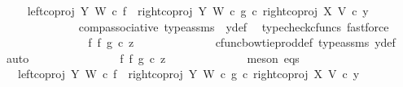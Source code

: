 \begin{isabellebody}
\ \isamarkupfalse%
\ {\isachardoublequoteopen}{\isachardot}{\kern0pt}{\isachardot}{\kern0pt}{\isachardot}{\kern0pt}\ {\isacharequal}{\kern0pt}\ {\isacharparenleft}{\kern0pt}{\isacharparenleft}{\kern0pt}left{\isacharunderscore}{\kern0pt}coproj\ Y\ W\ {\isasymcirc}\isactrlsub c\ f{\isacharparenright}{\kern0pt}\ {\isasymamalg}\ {\isacharparenleft}{\kern0pt}right{\isacharunderscore}{\kern0pt}coproj\ Y\ W\ {\isasymcirc}\isactrlsub c\ g{\isacharparenright}{\kern0pt}{\isacharparenright}{\kern0pt}\ {\isasymcirc}\isactrlsub c\ right{\isacharunderscore}{\kern0pt}coproj\ X\ V\ {\isasymcirc}\isactrlsub c\ y{}{\isachardoublequoteclose}\isanewline
\ \ \ \ \ \ \ \ \ \ \ \ \isamarkupfalse%
\ comp{\isacharunderscore}{\kern0pt}associative{}\ type{\isacharunderscore}{\kern0pt}assms\ \ y{}{\isacharunderscore}{\kern0pt}def\ \isamarkupfalse%
\ {\isacharparenleft}{\kern0pt}typecheck{\isacharunderscore}{\kern0pt}cfuncs{\isacharcomma}{\kern0pt}\ fastforce{\isacharparenright}{\kern0pt}\isanewline
\ \ \ \ \ \ \ \ \ \ \isamarkupfalse%
\ \isamarkupfalse%
\ {\isachardoublequoteopen}{\isachardot}{\kern0pt}{\isachardot}{\kern0pt}{\isachardot}{\kern0pt}\ {\isacharequal}{\kern0pt}\ {\isacharparenleft}{\kern0pt}f\ {\isasymbowtie}\isactrlsub f\ g{\isacharparenright}{\kern0pt}\ {\isasymcirc}\isactrlsub c\ z{}{\isachardoublequoteclose}\isanewline
\ \ \ \ \ \ \ \ \ \ \ \ \isamarkupfalse%
\ cfunc{\isacharunderscore}{\kern0pt}bowtie{\isacharunderscore}{\kern0pt}prod{\isacharunderscore}{\kern0pt}def{}\ type{\isacharunderscore}{\kern0pt}assms\ y{}{\isacharunderscore}{\kern0pt}def\ \isamarkupfalse%
\ auto\isanewline
\ \ \ \ \ \ \ \ \ \ \isamarkupfalse%
\ \isamarkupfalse%
\ {\isachardoublequoteopen}{\isachardot}{\kern0pt}{\isachardot}{\kern0pt}{\isachardot}{\kern0pt}\ {\isacharequal}{\kern0pt}\ {\isacharparenleft}{\kern0pt}f\ {\isasymbowtie}\isactrlsub f\ g{\isacharparenright}{\kern0pt}\ {\isasymcirc}\isactrlsub c\ z{}{\isachardoublequoteclose}\isanewline
\ \ \ \ \ \ \ \ \ \ \ \ \isamarkupfalse%
\ {\isacharparenleft}{\kern0pt}meson\ eqs{\isacharparenright}{\kern0pt}\isanewline
\ \ \ \ \ \ \ \ \ \ \isamarkupfalse%
\ \isamarkupfalse%
\ {\isachardoublequoteopen}{\isachardot}{\kern0pt}{\isachardot}{\kern0pt}{\isachardot}{\kern0pt}\ {\isacharequal}{\kern0pt}\ {\isacharparenleft}{\kern0pt}{\isacharparenleft}{\kern0pt}left{\isacharunderscore}{\kern0pt}coproj\ Y\ W\ {\isasymcirc}\isactrlsub c\ f{\isacharparenright}{\kern0pt}\ {\isasymamalg}\ {\isacharparenleft}{\kern0pt}right{\isacharunderscore}{\kern0pt}coproj\ Y\ W\ {\isasymcirc}\isactrlsub c\ g{\isacharparenright}{\kern0pt}{\isacharparenright}{\kern0pt}\ {\isasymcirc}\isactrlsub c\ right{\isacharunderscore}{\kern0pt}coproj\ X\ V\ {\isasymcirc}\isactrlsub c\ y{}{\isachardoublequoteclose}\isanewline

\end{isabellebody}
